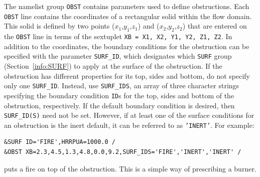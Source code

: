 \documentclass[11pt]{book}
\newcommand{\ct}{\tt\small}
\begin{document}
The namelist group {\ct OBST} contains parameters used to define obstructions.
Each {\ct OBST} line contains the coordinates of a rectangular
solid within the flow domain. This solid is defined by two points
($x_1$,$y_1$,$z_1$) and ($x_2$,$y_2$,$z_2$) that are entered on the
{\ct OBST} line in terms of the sextuplet {\ct XB = X1, X2, Y1, Y2, Z1, Z2}.
In addition to the coordinates, the boundary conditions for the obstruction
can be specified with the parameter {\ct SURF\_ID}, which designates which
{\ct SURF} group (Section~\ref{info:SURF}) to apply at the surface of the obstruction.
If the obstruction has different properties for its top,
sides and bottom, do not specify only one {\ct SURF\_ID}. Instead, use {\ct SURF\_IDS}, an array of three character
strings specifying the boundary condition {\ct ID}s for the top,
sides and bottom of the obstruction, respectively.
If the default
boundary condition is desired, then {\ct SURF\_ID(S)} need not be set.
However, if at least one of the surface conditions for an
obstruction is the inert default, it can be referred to as {\ct 'INERT'}.
For example:

\footnotesize
\begin{verbatim}
&SURF ID='FIRE',HRRPUA=1000.0 /
&OBST XB=2.3,4.5,1.3,4.8,0.0,9.2,SURF_IDS='FIRE','INERT','INERT' /
\end{verbatim}
\normalsize
puts a fire on top of the obstruction. This is a simple way of
prescribing a burner.
\end{document}
